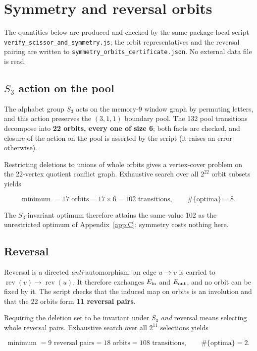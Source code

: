 \section{Symmetry and reversal orbits}
\label{app:D}

The quantities below are produced and checked by the same package-local script
\texttt{verify\_scissor\_and\_symmetry.js}; the orbit representatives and the
reversal pairing are written to \texttt{symmetry\_orbits\_certificate.json}.
No external data file is read.

\subsection*{\texorpdfstring{\(S_3\)}{S3} action on the pool}

The alphabet group \(S_3\) acts on the memory-9 window graph by permuting
letters, and this action preserves the \((3,1,1)\) boundary pool. The 132 pool
transitions decompose into \textbf{22 orbits, every one of size 6}; both facts
are checked, and closure of the action on the pool is asserted by the script
(it raises an error otherwise).

Restricting deletions to unions of whole orbits gives a vertex-cover problem
on the 22-vertex quotient conflict graph. Exhaustive search over all
\(2^{22}\) orbit subsets yields

\[
\text{minimum }=17\text{ orbits}=17\times6=102\text{ transitions},
\qquad
\#\{\text{optima}\}=8 .
\]

The \(S_3\)-invariant optimum therefore attains the same value 102 as the
unrestricted optimum of Appendix~\ref{app:C}; symmetry costs nothing here.

\subsection*{Reversal}

Reversal is a directed \emph{anti}-automorphism: an edge \(u\to v\) is carried
to \(\operatorname{rev}(v)\to\operatorname{rev}(u)\). It therefore exchanges
\(E_{\rm in}\) and \(E_{\rm out}\), and no orbit can be fixed by it. The script
checks that the induced map on orbits is an involution and that the 22 orbits
form \textbf{11 reversal pairs}.

Requiring the deletion set to be invariant under \(S_3\) \emph{and} reversal
means selecting whole reversal pairs. Exhaustive search over all \(2^{11}\)
selections yields

\[
\text{minimum }=9\text{ reversal pairs}=18\text{ orbits}=108\text{ transitions},
\qquad
\#\{\text{optima}\}=2 .
\]

